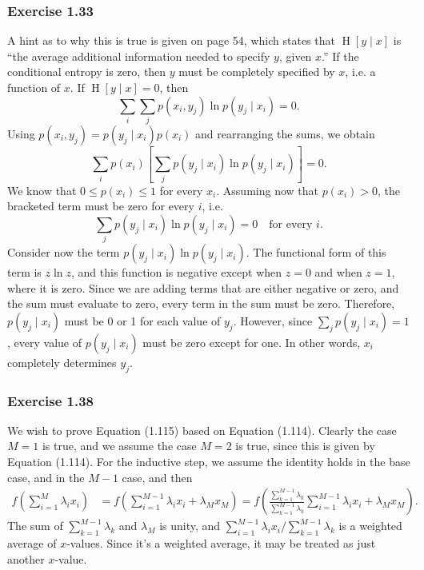 \documentclass[12pt, a4paper]{article}
\renewcommand{\H}{\operatorname{H}}
\begin{document}
\subsubsection*{Exercise 1.33}
A hint as to why this is true is given on page 54, which states that $\H\left[y 
\mid x\right]$ is ``the average additional information needed to specify $y$, 
given $x$.''
If the conditional entropy is zero, then $y$ must be completely specified by $x$, i.e. a function of $x$.
If $\H\left[y \mid x\right] = 0$, then
\begin{equation*}
	\sum_i \sum_j p(x_i, y_j) \ln p (y_j \mid x_i) = 0.
\end{equation*}
Using $ p(x_i, y_j) = p(y_j \mid x_i) p(x_i)$ and rearranging the sums, we obtain
\begin{equation*}
	\sum_i p(x_i) \left[ \sum_j p(y_j \mid x_i)  \ln p (y_j \mid x_i) \right] = 0.
\end{equation*}
We know that $0 \leq p (x_i) \leq 1$ for every $x_i$.
Assuming now that $p (x_i) > 0$, the bracketed term must be zero for every $i$, i.e.
\begin{equation*}
	\sum_j p(y_j \mid x_i)  \ln p (y_j \mid x_i) = 0 \quad \text{for every } i.
\end{equation*}
Consider now the term $p(y_j \mid x_i)  \ln p (y_j \mid x_i)$.
The functional form of this term is $z \ln z$, and this function is negative 
except when $z = 0$ and when $z=1$, where it is zero.
Since we are adding terms that are either negative or zero, and the sum must 
evaluate to zero, every term in the sum must be zero.
Therefore, $p(y_j \mid x_i)$ must be 0 or 1 for each value of $y_j$.
However, since $\sum_j p(y_j \mid x_i) = 1$, every value of $p(y_j \mid x_i)$ 
must be zero except for one.
In other words, $x_i$ completely determines $y_j$.


\subsubsection*{Exercise 1.38}
We wish to prove Equation (1.115) based on Equation (1.114).
Clearly the case $M=1$ is true, and we assume the case $M=2$ is true, since this is given by Equation (1.114).
For the inductive step, we assume the identity holds in the base case, and in 
the $M-1$ case, and then
\begin{align*}
	f \left( \sum_{i=1}^{M} \lambda_i x_i \right)
	&= f \left( \sum_{i=1}^{M-1} \lambda_i x_i + \lambda_M x_M \right)
	= f \left( \frac{\sum_{k=1}^{M-1} \lambda_k}{\sum_{k=1}^{M-1} \lambda_k} \sum_{i=1}^{M-1} \lambda_i x_i + \lambda_M x_M \right).
\end{align*}
The sum of $\sum_{k=1}^{M-1} \lambda_k$ and $\lambda_M$ is unity, and $\sum_{i=1}^{M-1} \lambda_i x_i / \sum_{k=1}^{M-1} \lambda_k$ is a weighted average of $x$-values.
Since it's a weighted average, it may be treated as just another $x$-value.
\end{document}
